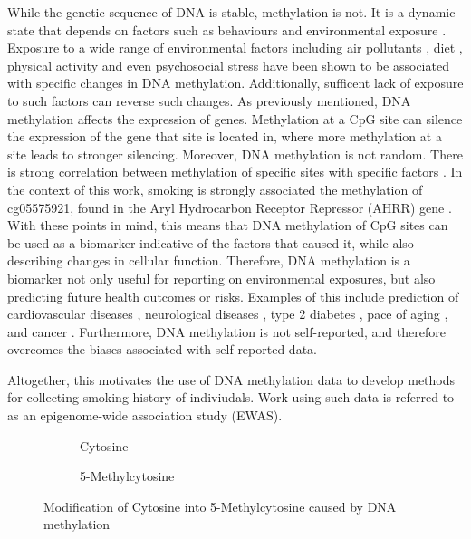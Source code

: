 \documentclass{article}
\begin{document}
While the genetic sequence of DNA is stable, methylation is not. It is a dynamic state that depends on factors such as behaviours and environmental exposure \cite{greenberg2019diverse}. Exposure to a wide range of environmental factors including air pollutants \cite{martin2018environmental}, diet \cite{ma2020whole}, physical activity and even psychosocial stress \cite{opsasnick2024epigenome} have been shown to be associated with specific changes in DNA methylation. Additionally, sufficent lack of exposure to such factors can reverse such changes. As previously mentioned, DNA methylation affects the expression of genes. Methylation at a CpG site can silence the expression of the gene that site is located in, where more methylation at a site leads to stronger silencing. Moreover, DNA methylation is not random. There is strong correlation between methylation of specific sites with specific factors \cite{ewasatlas}. In the context of this work, smoking is strongly associated the methylation of cg05575921, found in the Aryl Hydrocarbon Receptor
Repressor (AHRR) gene \cite{reynolds2015dna}. With these points in mind, this means that DNA methylation of CpG sites can be used as a biomarker indicative of the factors that caused it, while also describing changes in cellular function. Therefore, DNA methylation is a biomarker not only useful for reporting on environmental exposures, but also predicting future health outcomes or risks. Examples of this include prediction of cardiovascular diseases \cite{cameron2023dna}, neurological diseases \cite{cells11213439}, type 2 diabetes \cite{cheng2023development}, pace of aging \cite{10.7554/eLife.73420}, and cancer \cite{luo2020circulating}. Furthermore, DNA methylation is not self-reported, and therefore overcomes the biases associated with self-reported data.

Altogether, this motivates the use of DNA methylation data to develop methods for collecting smoking history of indiviudals. Work using such data is referred to as an epigenome-wide association study (EWAS).

\begin{figure}
    \begin{subfigure}{0.49\textwidth}
        \centering
        \hspace*{11mm}
        \vspace{3mm}
        \caption{Cytosine}
    \end{subfigure}
    \begin{subfigure}{0.49\textwidth}
        \centering
        \vspace{3mm}
        \caption{5-Methylcytosine}
    \end{subfigure}
    \caption*{Modification of Cytosine into 5-Methylcytosine caused by DNA methylation}
\end{figure}
\end{document}
